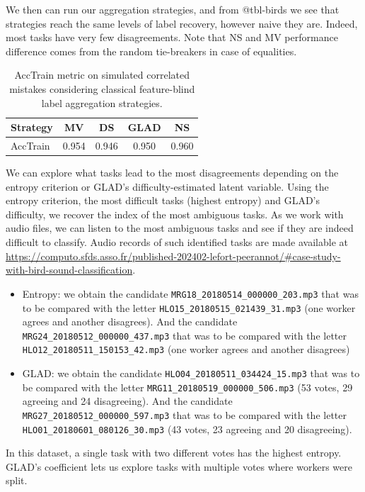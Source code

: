 We then can run our aggregation strategies, and from @tbl-birds we see that strategies reach the same levels of label recovery, however naive they are. Indeed, most tasks have very few disagreements.
Note that NS and MV performance difference comes from the random tie-breakers in case of equalities.

\begin{table}[htbp]
    \centering
    \caption{AccTrain metric on simulated correlated mistakes considering classical feature-blind label aggregation strategies.}
    \label{tab:accuracy_train_audiobirds}
    \begin{tabular}{|l|c|c|c|c|}
    \hline
    \textbf{Strategy} & \textbf{MV} & \textbf{DS} & \textbf{GLAD} & \textbf{NS} \\
    \hline
    AccTrain & 0.954 	&0.946 &	0.950& 	0.960\\
    \hline
    \end{tabular}
    \end{table}

We can explore what tasks lead to the most disagreements depending on the entropy criterion or GLAD's difficulty-estimated latent variable.
Using the entropy criterion, the most difficult tasks (highest entropy) and GLAD's difficulty, we recover the index of the most ambiguous tasks.
As we work with audio files, we can listen to the most ambiguous tasks and see if they are indeed difficult to classify.
Audio records of such identified tasks are made available at \url{https://computo.sfds.asso.fr/published-202402-lefort-peerannot/#case-study-with-bird-sound-classification}.

\begin{itemize}
    \item Entropy: we obtain the candidate \texttt{MRG18\_20180514\_000000\_203.mp3} that was to be compared with the letter \texttt{HLO15\_20180515\_021439\_31.mp3} (one worker agrees and another disagrees).
    And the candidate \texttt{MRG24\_20180512\_000000\_437.mp3} that was to be compared with the letter \texttt{HLO12\_20180511\_150153\_42.mp3} (one worker agrees and another disagrees)
    \item GLAD: we obtain the candidate \texttt{HLO04\_20180511\_034424\_15.mp3} that was to be compared with the letter \texttt{MRG11\_20180519\_000000\_506.mp3} (53 votes, 29 agreeing and 24 disagreeing). And the candidate \texttt{MRG27\_20180512\_000000\_597.mp3} that was to be compared with the letter \texttt{HLO01\_20180601\_080126\_30.mp3} (43 votes, 23 agreeing and 20 disagreeing).

\end{itemize}
In this dataset, a single task with two different votes has the highest entropy. GLAD's coefficient lets us explore tasks with multiple votes where workers were split.

